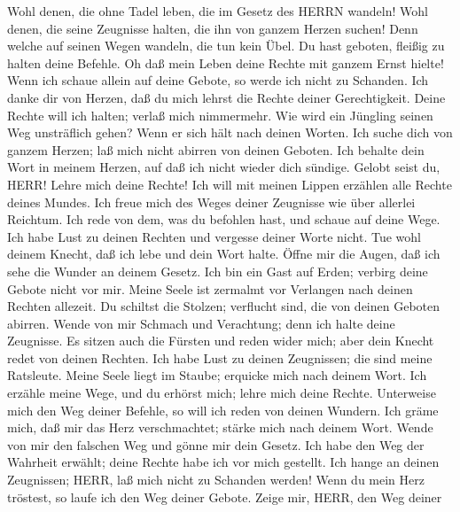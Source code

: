  Wohl denen, die ohne Tadel leben, die im Gesetz des HERRN
wandeln!  Wohl denen, die seine Zeugnisse halten, die ihn
von ganzem Herzen suchen!  Denn welche auf seinen Wegen
wandeln, die tun kein Übel.  Du hast geboten, fleißig zu
halten deine Befehle.  Oh daß mein Leben deine Rechte mit
ganzem Ernst hielte!  Wenn ich schaue allein auf deine
Gebote, so werde ich nicht zu Schanden.  Ich danke dir von
Herzen, daß du mich lehrst die Rechte deiner Gerechtigkeit. 
Deine Rechte will ich halten; verlaß mich nimmermehr.  Wie
wird ein Jüngling seinen Weg unsträflich gehen? Wenn er sich hält nach
deinen Worten.  Ich suche dich von ganzem Herzen; laß mich
nicht abirren von deinen Geboten.  Ich behalte dein Wort in
meinem Herzen, auf daß ich nicht wieder dich sündige. 
Gelobt seist du, HERR! Lehre mich deine Rechte!  Ich will
mit meinen Lippen erzählen alle Rechte deines Mundes.  Ich
freue mich des Weges deiner Zeugnisse wie über allerlei Reichtum.
 Ich rede von dem, was du befohlen hast, und schaue auf
deine Wege.  Ich habe Lust zu deinen Rechten und vergesse
deiner Worte nicht.  Tue wohl deinem Knecht, daß ich lebe
und dein Wort halte.  Öffne mir die Augen, daß ich sehe die
Wunder an deinem Gesetz.  Ich bin ein Gast auf Erden;
verbirg deine Gebote nicht vor mir.  Meine Seele ist
zermalmt vor Verlangen nach deinen Rechten allezeit.  Du
schiltst die Stolzen; verflucht sind, die von deinen Geboten abirren.
 Wende von mir Schmach und Verachtung; denn ich halte deine
Zeugnisse.  Es sitzen auch die Fürsten und reden wider
mich; aber dein Knecht redet von deinen Rechten.  Ich habe
Lust zu deinen Zeugnissen; die sind meine Ratsleute.  Meine
Seele liegt im Staube; erquicke mich nach deinem Wort.  Ich
erzähle meine Wege, und du erhörst mich; lehre mich deine Rechte.
 Unterweise mich den Weg deiner Befehle, so will ich reden
von deinen Wundern.  Ich gräme mich, daß mir das Herz
verschmachtet; stärke mich nach deinem Wort.  Wende von mir
den falschen Weg und gönne mir dein Gesetz.  Ich habe den
Weg der Wahrheit erwählt; deine Rechte habe ich vor mich gestellt.
 Ich hange an deinen Zeugnissen; HERR, laß mich nicht zu
Schanden werden!  Wenn du mein Herz tröstest, so laufe ich
den Weg deiner Gebote.  Zeige mir, HERR, den Weg deiner
